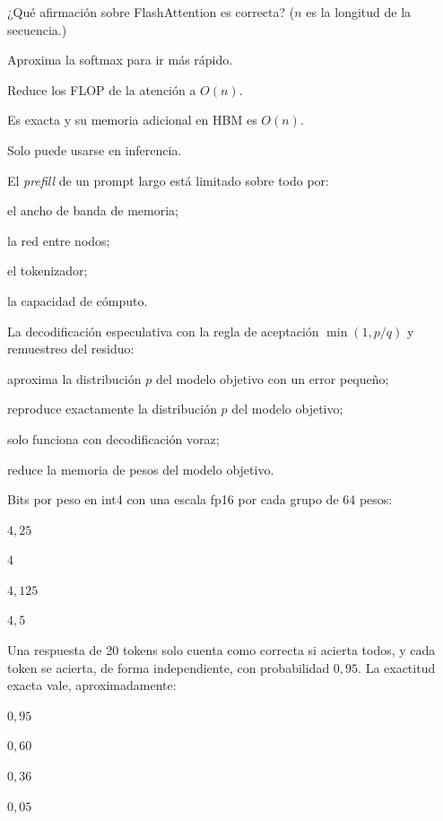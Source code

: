 \begin{cuestiones}
\item {} ¿Qué afirmación sobre FlashAttention es correcta? ($n$ es la longitud de la secuencia.)
\begin{opciones}
  \item Aproxima la softmax para ir más rápido.
  \item Reduce los FLOP de la atención a $O(n)$.
  \item Es exacta y su memoria adicional en HBM es $O(n)$.
  \item Solo puede usarse en inferencia.
\end{opciones}

\item {} El \emph{prefill} de un prompt largo está limitado sobre todo por:
\begin{opciones}
  \item el ancho de banda de memoria;
  \item la red entre nodos;
  \item el tokenizador;
  \item la capacidad de cómputo.
\end{opciones}

\item {} La decodificación especulativa con la regla de aceptación $\min(1,p/q)$ y remuestreo del residuo:
\begin{opciones}
  \item aproxima la distribución $p$ del modelo objetivo con un error pequeño;
  \item reproduce exactamente la distribución $p$ del modelo objetivo;
  \item solo funciona con decodificación voraz;
  \item reduce la memoria de pesos del modelo objetivo.
\end{opciones}

\item {} Bits por peso en int4 con una escala fp16 por cada grupo de 64 pesos:
\begin{opciones}
  \item $4{,}25$
  \item $4$
  \item $4{,}125$
  \item $4{,}5$
\end{opciones}

\item {} Una respuesta de 20 tokens solo cuenta como correcta si acierta todos, y cada token se acierta, de forma independiente, con probabilidad $0{,}95$. La exactitud exacta vale, aproximadamente:
\begin{opciones}
  \item $0{,}95$
  \item $0{,}60$
  \item $0{,}36$
  \item $0{,}05$
\end{opciones}


\end{cuestiones}
